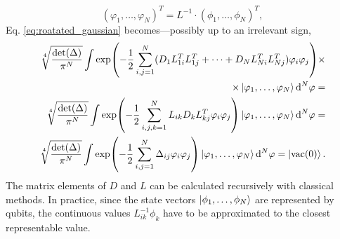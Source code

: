 \documentclass[a4paper,10pt]{report}
\begin{document}
\begin{equation}
(\varphi_1,\dots,\varphi_N)^T = L^{-1}\cdot(\phi_1,\dots,\phi_N)^T,
\end{equation}
Eq. \eqref{eq:roatated_gaussian} becomes---possibly up to an irrelevant sign,
\begin{align}
\sqrt[4]{\frac{\det(\Delta)}{\pi^N}}\int\exp(-\frac{1}{2}\sum_{i,j=1}^N(D_1L_{1i}^TL_{1j}^T+\dots+D_NL_{Ni}^TL_{Nj}^T)\varphi_i\varphi_j)\times \nonumber\\
\times\ket{\varphi_1,\dots,\varphi_N}\dd[N]{\varphi} = \nonumber\\
\sqrt[4]{\frac{\det(\Delta)}{\pi^N}}\int\exp(-\frac{1}{2}\sum_{i,j,k=1}^N L_{ik}D_kL_{kj}^T\varphi_i\varphi_j)\ket{\varphi_1,\dots,\varphi_N}\dd[N]{\varphi} = \nonumber \\
\sqrt[4]{\frac{\det(\Delta)}{\pi^N}}\int\exp(-\frac{1}{2}\sum_{i,j=1}^N \Delta_{ij}\varphi_i\varphi_j)\ket{\varphi_1,\dots,\varphi_N}\dd[N]{\varphi} = \ket{\mathrm{vac}(0)}.
\end{align}
The matrix elements of $D$ and $L$ can be calculated recursively with classical methods. In practice, since the state vectors $\ket{\phi_1,\dots,\phi_N}$ are represented by qubits, the continuous values $L^{-1}_{ik}\phi_k$ have to be approximated to the closest representable value.
 
\end{document}

